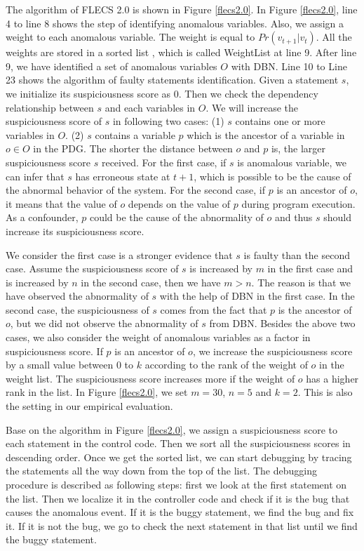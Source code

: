 The algorithm of FLECS 2.0 is shown in Figure \ref{flecs2.0}. In Figure \ref{flecs2.0}, line 4 to line 8 shows the step of identifying anomalous variables.  Also, we assign a weight to each anomalous variable. The weight is equal to $Pr(v_{t+1}|v_t)$. All the weights are stored in a sorted list , which is called WeightList at line 9.  After line 9, we have identified a set of anomalous variables $O$ with DBN.  Line 10 to Line 23 shows the algorithm of faulty statements identification. Given a statement $s$, we initialize its suspiciousness score as 0. Then we check the dependency relationship between $s$ and each variables in $O$. We will increase the suspiciousness score of $s$ in following two cases: (1) $s$ contains one or more variables in $O$. (2) $s$ contains a variable $p$ which is the ancestor of a variable in $o \in O$ in the PDG. The shorter the distance between $o$ and $p$ is, the larger suspiciousness score $s$ received. For the first case, if $s$ is anomalous variable, we can infer that $s$ has erroneous state at $t+1$, which is possible to be the cause of the abnormal behavior of the system. For the second case, if $p$ is an ancestor of $o$, it means that the value of $o$ depends on the value of $p$ during program execution. As a confounder, $p$ could be the cause of the abnormality of $o$ and thus $s$ should increase its suspiciousness score. 

We consider the first case is a stronger evidence that $s$ is faulty than the second case.  Assume the suspiciousness score of $s$ is increased by $m$ in the first case and is increased by $n$ in the second case, then we have $m>n$. The reason is that we have observed the abnormality of $s$ with the help of DBN in the first case. In the second case, the suspiciousness of $s$ comes from the fact that $p$ is the ancestor of $o$,  but we did not observe the abnormality of $s$ from DBN.  Besides the above two cases, we also consider the weight of anomalous variables as a factor in suspiciousness score. If $p$ is an ancestor of $o$, we increase the suspiciousness score by a small value between 0 to $k$ according to the rank of the weight of $o$ in the weight list. The suspiciousness score increases more if the weight of $o$ has a higher rank in the list. In Figure \ref{flecs2.0}, we set $m=30$, $n=5$ and $k=2$. This is also the setting in our empirical evaluation.

Base on the algorithm in Figure \ref{flecs2.0}, we assign a suspiciousness score to each statement in the control code. Then we sort all the suspiciousness scores in descending order. Once we get the sorted list, we can start debugging by tracing the statements all the way down from the top of the list. The debugging procedure is described as following steps: first we look at the first statement on the list. Then we localize it in the controller code and check if it is the bug that causes the anomalous event. If it is the buggy statement, we find the bug and fix it. If it is not the bug, we go to check the next statement in that list until we find the buggy statement.

